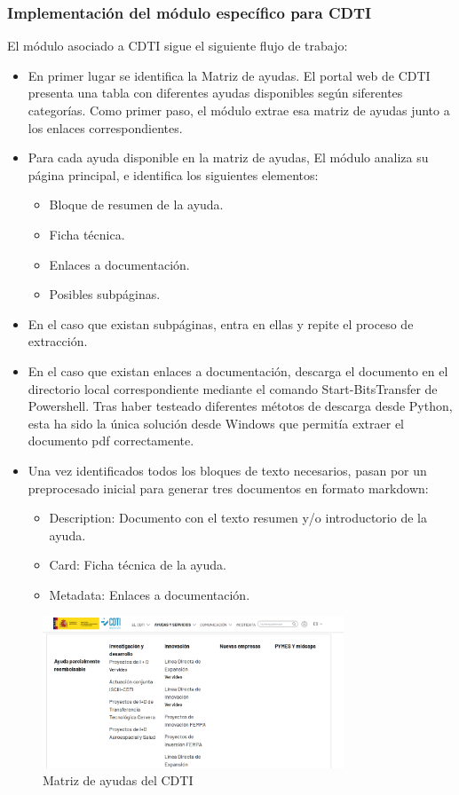 \subsubsection{Implementación del módulo específico para CDTI}

El módulo asociado a CDTI sigue el siguiente flujo de trabajo:

\begin{itemize}
    \item En primer lugar se identifica la Matriz de ayudas. El portal web de CDTI presenta una tabla con diferentes ayudas disponibles según siferentes categorías. Como primer paso, el módulo extrae esa matriz de ayudas junto a los enlaces correspondientes.
    \item Para cada ayuda disponible en la matriz de ayudas, El módulo analiza su página principal, e identifica los siguientes elementos:
    \begin{itemize}
        \item Bloque de resumen de la ayuda.
        \item Ficha técnica.
        \item Enlaces a documentación.
        \item Posibles subpáginas.
    \end{itemize}
    \item En el caso que existan subpáginas, entra en ellas y repite el proceso de extracción.
    \item En el caso que existan enlaces a documentación, descarga el documento en el directorio local correspondiente mediante el comando Start-BitsTransfer de Powershell.
    Tras haber testeado diferentes métotos de descarga desde Python, esta ha sido la única solución desde Windows que permitía extraer el documento pdf correctamente. 
    \item Una vez identificados todos los bloques de texto necesarios, pasan por un preprocesado inicial para generar tres documentos en formato markdown:
    \begin{itemize}
        \item Description: Documento con el texto resumen y/o introductorio de la ayuda.
        \item Card: Ficha técnica de la ayuda.
        \item Metadata: Enlaces a documentación.
    \end{itemize}
\end{itemize}


\begin{figure}[h]
	\centering
	\includegraphics[width=0.8\textwidth]{figs/cdti_matrix.png}
	\caption{Matriz de ayudas del CDTI}
	\label{fig:context-anoni1}
\end{figure}



